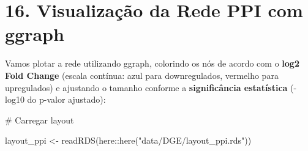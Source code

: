 \documentclass[
  letterpaper,
  DIV=11,
  numbers=noendperiod]{scrreprt}
\newenvironment{Shaded}{\begin{snugshade}}{\end{snugshade}}
\newcommand{\CommentTok}[1]{\textcolor[rgb]{0.37,0.37,0.37}{#1}}
\newcommand{\FunctionTok}[1]{\textcolor[rgb]{0.28,0.35,0.67}{#1}}
\newcommand{\NormalTok}[1]{\textcolor[rgb]{0.00,0.23,0.31}{#1}}
\newcommand{\OtherTok}[1]{\textcolor[rgb]{0.00,0.23,0.31}{#1}}
\newcommand{\SpecialCharTok}[1]{\textcolor[rgb]{0.37,0.37,0.37}{#1}}
\newcommand{\StringTok}[1]{\textcolor[rgb]{0.13,0.47,0.30}{#1}}
\begin{document}
\section{16. Visualização da Rede PPI com
ggraph}\label{visualizauxe7uxe3o-da-rede-ppi-com-ggraph}

Vamos plotar a rede utilizando ggraph, colorindo os nós de acordo com o
\textbf{log2 Fold Change} (escala contínua: azul para downregulados,
vermelho para upregulados) e ajustando o tamanho conforme a
\textbf{significância estatística} (-log10 do p-valor ajustado):

\begin{Shaded}
\begin{Highlighting}[]
\CommentTok{\# Carregar layout}

\NormalTok{layout\_ppi }\OtherTok{\textless{}{-}} \FunctionTok{readRDS}\NormalTok{(here}\SpecialCharTok{::}\FunctionTok{here}\NormalTok{(}\StringTok{"data/DGE/layout\_ppi.rds"}\NormalTok{))}


\end{Highlighting}
\end{Shaded}
\end{document}
